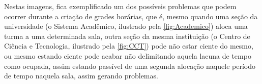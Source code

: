 Nestas imagens, fica exemplificado um dos possíveis problemas que podem ocorrer durante a criação de grades horárias, que é, mesmo quando uma seção da universidade (o Sistema Acadêmico, ilustrado pela \autoref{fig:Academico}) aloca uma turma a uma determinada sala, outra seção da mesma instituição (o Centro de Ciência e Tecnologia, ilustrado pela \autoref{fig:CCT}) pode não estar ciente do mesmo, ou mesmo estando ciente pode acabar não delimitando aquela lacuna de tempo como ocupada, assim estando passível de uma segunda alocação naquele período de tempo naquela sala, assim gerando problemas.
